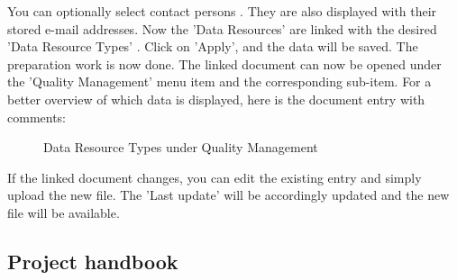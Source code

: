 You can optionally select contact persons . They are also displayed with their stored e-mail addresses. Now the 'Data Resources' are linked with the desired 'Data Resource Types' . Click on 'Apply', and the data will be saved. The preparation work is now done. The linked document can now be opened under the 'Quality Management' menu item and the corresponding sub-item. For a better overview of which data is displayed, here is the document entry with comments:

\begin{figure}[H]
\caption{Data Resource Types under Quality Management}
\end{figure}

If the linked document changes, you can edit the existing entry and simply upload the new file. The 'Last update' will be accordingly updated and the new file will be available.

\subsection{Project handbook}


